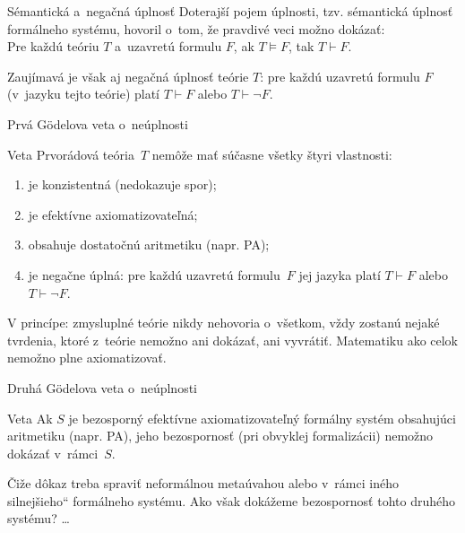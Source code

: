 \documentclass[12pt]{beamer}
\providecommand{\uv}[1]{\quotedblbase #1\textquotedblleft}
\newcommand{\entails}{\vDash}
\begin{document}
\begin{frame}{Sémantická a~negačná úplnosť}
  Doterajší pojem úplnosti, tzv. \alert{sémantická úplnosť} formálneho systému,
  hovoril o~tom, že pravdivé veci možno dokázať:\\
  Pre každú teóriu $T$ a~uzavretú formulu $F$, ak $T\entails F$, tak $T\vdash F$.

  Zaujímavá je však aj \alert{negačná úplnosť} teórie $T$:
  pre každú uzavretú formulu $F$ (v~jazyku tejto teórie)
  platí $T\vdash F$ alebo $T\vdash \lnot F$.
\end{frame}

\begin{frame}{Prvá G\"odelova veta o~neúplnosti}
  \begin{block}{Veta}
    Prvorádová teória~$T$ nemôže mať súčasne všetky štyri vlastnosti:
    \begin{enumerate}
      \item je konzistentná (nedokazuje spor);
      \item je efektívne axiomatizovateľná;
      \item obsahuje dostatočnú aritmetiku (napr. PA);
      \item je negačne úplná: pre každú uzavretú formulu~$F$ jej jazyka
        platí $T\vdash F$ alebo $T\vdash\lnot F$.
    \end{enumerate}
  \end{block}
  V princípe: zmysluplné teórie nikdy nehovoria o~všetkom, vždy zostanú
  nejaké tvrdenia, ktoré z~teórie nemožno ani dokázať, ani vyvrátiť.
  Matematiku ako celok nemožno plne axiomatizovať.
\end{frame}

\begin{frame}{Druhá G\"odelova veta o~neúplnosti}
  \begin{block}{Veta}
    Ak $S$ je bezosporný efektívne axiomatizovateľný
    formálny systém obsahujúci aritmetiku (napr. PA),
    jeho bezospornosť (pri obvyklej formalizácii)
    nemožno dokázať v~rámci~$S$.
  \end{block}
  Čiže dôkaz treba spraviť neformálnou metaúvahou alebo v~rámci iného \uv{silnejšieho} formálneho systému.
  Ako však dokážeme bezospornosť tohto druhého systému? \dots
\end{frame}
\end{document}
